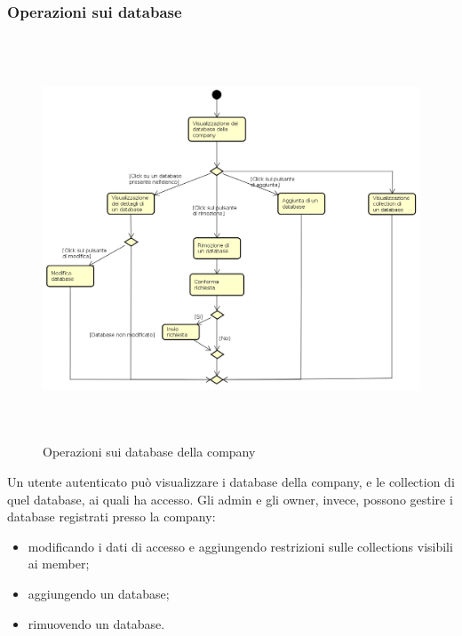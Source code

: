\subsubsection{Operazioni sui database}
\begin{figure}[H]
\begin{center}
\includegraphics[height=12cm]{res/sections/backend/activities/gestioneDatabase.png}
\caption{Operazioni sui database della company}
\end{center}
\end{figure}
Un utente autenticato può visualizzare i database della company, e le collection di quel database, ai quali ha accesso. Gli admin e gli owner, invece, possono gestire i database registrati presso la company:
\begin{itemize}
\item modificando i dati di accesso e aggiungendo restrizioni sulle collections visibili ai member;
\item aggiungendo un database;
\item rimuovendo un database.
\end{itemize} 
